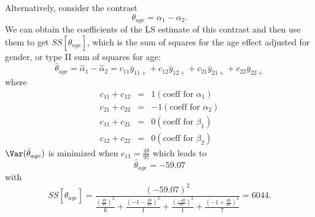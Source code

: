 \par\noindent
Alternatively, consider the contrast 
$$ \theta_{age} = \alpha_1 - \alpha_2.$$
We can obtain the coefficients of the LS estimate of this contrast
and then use them to get $SS[\hat\theta_{age}]$, which is the sum
of squares for the age effect adjusted for gender, or type II sum
of squares for age:
$$ \hat\theta_{age} = \hat\alpha_1 - \hat\alpha_2 = 
 c_{11}\bar{y}_{11+} + c_{12}\bar{y}_{12+}  + c_{21}\bar{y}_{21+}  + c_{22}\bar{y}_{22+}$$ 
where 
\begin{eqnarray*}
c_{11} + c_{12} & = & 1 (\mbox{coeff for }\alpha_1)\\
c_{21}+c_{22} & = & -1 (\mbox{coeff for }\alpha_2) \\
c_{11}+c_{21} & = & 0  (\mbox{coeff for }\beta_1)\\
c_{12}+c_{22} & = & 0 (\mbox{coeff for }\beta_2)
\end{eqnarray*}
$\Var(\hat\theta_{age})$ is minimized when $c_{11}=\frac{48}{97}$
which leads to 
$$\hat\theta_{age}=-59.07$$
with
$$
SS[\hat\theta_{age}] = \frac{(-59.07)^2}{\frac{(\frac{48}{97})^2}{6} + \frac{(-1-\frac{48}{97})^2}{1}  + \frac{(\frac{-48}{97})^2}{1} + \frac{(-1+\frac{48}{97})^2}{7}} = 6044.$$ 
\newpage
